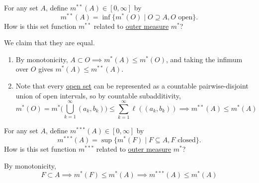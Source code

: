   \begin{exercise}[Royden 2.22]
    For any set $A$, define $m^{\ast\ast}(A) \in [0, \infty]$ by
    \begin{equation*}
      m^{\ast\ast}(A) = \inf \{m^{\ast}(O) \mid O \supseteq A, O \text{ open}\}.
    \end{equation*}
    How is this set function $m^{\ast\ast}$ related to \hyperref[def:outer-measure]{outer measure} $m^{\ast}$?
  \end{exercise}
  \begin{solution}
    We claim that they are equal. 
    \begin{enumerate}
      \item By monotonicity, $A \subset O \implies m^\ast (A) \leq m^\ast (O)$, and taking the infimum over $O$ gives $m^\ast (A) \leq m^{\ast\ast} (A)$. 
      \item Note that every \hyperref[pst-def:open-set]{open set} can be represented as a countable pairwise-disjoint union of open intervals, so by countable subadditivity, 
        \begin{equation}
          m^\ast (O) = m^\ast \bigg( \bigcup_{k=1}^\infty (a_k, b_k) \bigg) \leq \sum_{k=1}^\infty \ell ((a_k, b_k)) \implies m^{\ast\ast} (A) \leq m^\ast (A)
        \end{equation}
    \end{enumerate}
  \end{solution}

  \begin{exercise}[Royden 2.23]
    For any set $A$, define $m^{\ast\ast\ast}(A) \in [0, \infty]$ by
    \begin{equation*}
      m^{\ast\ast\ast}(A) = \sup \{m^{\ast}(F) \mid F \subseteq A, F \text{ closed}\}.
    \end{equation*}
    How is this set function $m^{\ast\ast\ast}$ related to \hyperref[def:outer-measure]{outer measure} $m^{\ast}$?
  \end{exercise}
  \begin{solution}
    By monotonicity, 
    \begin{equation}
      F \subset A \implies m^\ast (F) \leq m^\ast (A) \implies m^{\ast\ast\ast} (A) \leq m^\ast (A)
    \end{equation}
  \end{solution}

